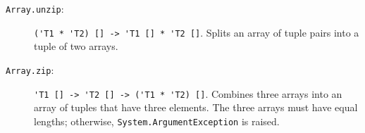 \begin{description}
\item[\texttt{Array.unzip}:] \lstinline{('T1 * 'T2) [] -> 'T1 [] * 'T2 []}. Splits an array of tuple pairs into a tuple of two arrays.
\item[\texttt{Array.zip}:] \lstinline{'T1 [] -> 'T2 [] -> ('T1 * 'T2) []}. Combines three arrays into an array of tuples that have three elements. The three arrays must have equal lengths; otherwise, \lstinline{System.ArgumentException} is raised.
\end{description}

